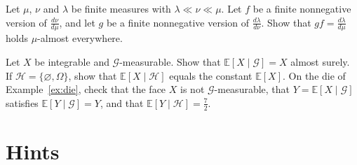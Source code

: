 \begin{exercise}[$\star\star$]\label{ex:v7c11c}
Let $\mu$, $\nu$ and $\lambda$ be finite measures with $\lambda\ll\nu\ll\mu$. Let $f$ be a finite nonnegative version of $\frac{d\nu}{d\mu}$, and let $g$ be a finite nonnegative version of $\frac{d\lambda}{d\nu}$. Show that $gf=\frac{d\lambda}{d\mu}$ holds $\mu$-almost everywhere.
\end{exercise}

\begin{exercise}[$\star$]\label{ex:v7c11d}
Let $X$ be integrable and $\mathcal G$-measurable. Show that $\mathbb E[X\mid\mathcal G]=X$ almost surely. If $\mathcal H=\{\varnothing,\Omega\}$, show that $\mathbb E[X\mid\mathcal H]$ equals the constant $\mathbb E[X]$. On the die of Example~\ref{ex:die}, check that the face $X$ is not $\mathcal G$-measurable, that $Y=\mathbb E[X\mid\mathcal G]$ satisfies $\mathbb E[Y\mid\mathcal G]=Y$, and that $\mathbb E[Y\mid\mathcal H]=\frac72$.
\end{exercise}

\section{Hints}


